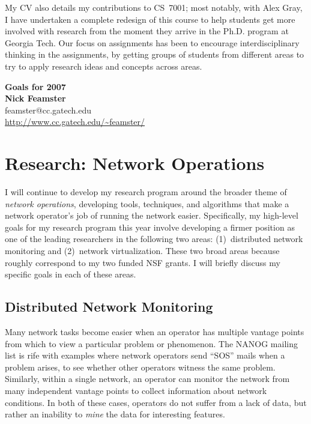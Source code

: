 \begin{sloppypar}
My CV also details my contributions to CS~7001; most notably, with Alex
Gray, I have undertaken a complete redesign of this course to help
students get more involved with research from the moment they arrive in
the Ph.D. program at Georgia Tech.  Our focus on assignments has been to
encourage interdisciplinary thinking in the assignments, by getting
groups of students from different areas to try to apply research ideas
and concepts across areas.

\newpage
\begin{center}
{\Large\textbf{Goals for 2007}}\\[.1in]
{\large\textbf{Nick Feamster}}\\[.05in]
feamster@cc.gatech.edu \\
\url{http://www.cc.gatech.edu/~feamster/} \\[.1in]
\end{center}

\section*{Research: Network Operations}

I will continue to develop my research program around the broader theme
of {\em network operations}, developing tools, techniques, and
algorithms that make a network operator's job of running the network
easier.  Specifically, my high-level goals for my research program this
year involve developing a firmer position as one of the leading
researchers in the following two areas: (1)~distributed network
monitoring and (2)~network virtualization.  These two broad areas
because roughly correspond to my two funded NSF grants.  I will briefly
discuss my specific goals in each of these areas.

\subsection*{Distributed Network Monitoring}

Many network tasks become easier when an operator has multiple vantage
points from which to view a particular problem or phenomenon.  The NANOG
mailing list is rife with examples where network operators send ``SOS''
mails when a problem arises, to see whether other operators witness the
same problem.  Similarly, within a single network, an operator can
monitor the network from many independent vantage points to collect
information about network conditions.  In both of these cases, operators
do not suffer from a lack of data, but rather an inability to {\em mine}
the data for interesting features.  


\end{sloppypar}
